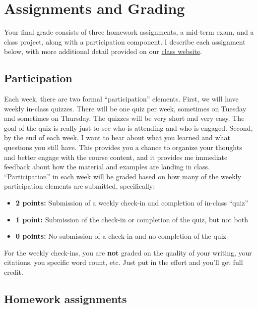 \documentclass[11pt,]{article}
\providecommand{\tightlist}{%
  \setlength{\itemsep}{0pt}\setlength{\parskip}{0pt}}
\begin{document}
\hypertarget{assignments-and-grading}{%
\section{Assignments and Grading}\label{assignments-and-grading}}

Your final grade consists of three homework assignments, a mid-term
exam, and a class project, along with a participation component. I
describe each assignment below, with more additional detail provided on
our \href{https://mccarthy-spring21-econ372.netlify.app/}{class
website}.

\hypertarget{participation}{%
\subsection{Participation}\label{participation}}

Each week, there are two formal ``participation'' elements. First, we
will have weekly in-class quizzes. There will be one quiz per week,
sometimes on Tuesday and sometimes on Thursday. The quizzes will be very
short and very easy. The goal of the quiz is really just to see who is
attending and who is engaged. Second, by the end of each week, I want to
hear about what you learned and what questions you still have. This
provides you a chance to organize your thoughts and better engage with
the course content, and it provides me immediate feedback about how the
material and examples are landing in class. ``Participation'' in each
week will be graded based on how many of the weekly participation
elements are submitted, specifically:

\begin{itemize}
\tightlist
\item
  \textbf{2 points:} Submission of a weekly check-in and completion of
  in-class ``quiz''
\item
  \textbf{1 point:} Submission of the check-in or completion of the
  quiz, but not both
\item
  \textbf{0 points:} No submission of a check-in and no completion of
  the quiz
\end{itemize}

For the weekly check-ins, you are \textbf{not} graded on the quality of
your writing, your citations, you specific word count, etc. Just put in
the effort and you'll get full credit.

\hypertarget{homework-assignments}{%
\subsection{Homework assignments}\label{homework-assignments}}
\end{document}
